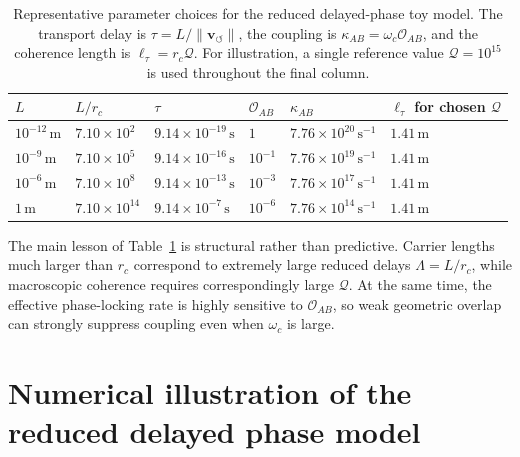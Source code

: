 \documentclass[11pt]{article}
\newcommand{\vnorm}{\lVert \mathbf{v}_{\!\boldsymbol{\circlearrowleft}}\rVert}
\newcommand{\rc}{r_c}
\begin{document}
        \begin{table}[h]
            \centering
            \caption{Representative parameter choices for the reduced delayed-phase toy model. The transport delay is \(\tau=L/\vnorm\), the coupling is \(\kappa_{AB}=\omega_c\mathcal{O}_{AB}\), and the coherence length is \(\ell_\tau=\rc\mathcal{Q}\). For illustration, a single reference value \(\mathcal{Q}=10^{15}\) is used throughout the final column.}
            \label{tab:toyparams}
            \begin{tabular}{llllll}
                \hline
                \(L\) & \(L/\rc\) & \(\tau\) & \(\mathcal{O}_{AB}\) & \(\kappa_{AB}\) & \(\ell_\tau\) for chosen \(\mathcal{Q}\) \\
                \hline
                \(10^{-12}\,\mathrm{m}\) & \(7.10\times 10^2\) & \(9.14\times 10^{-19}\,\mathrm{s}\) & \(1\) & \(7.76\times 10^{20}\,\mathrm{s^{-1}}\) & \(1.41\,\mathrm{m}\) \\
                \(10^{-9}\,\mathrm{m}\) & \(7.10\times 10^5\) & \(9.14\times 10^{-16}\,\mathrm{s}\) & \(10^{-1}\) & \(7.76\times 10^{19}\,\mathrm{s^{-1}}\) & \(1.41\,\mathrm{m}\) \\
                \(10^{-6}\,\mathrm{m}\) & \(7.10\times 10^8\) & \(9.14\times 10^{-13}\,\mathrm{s}\) & \(10^{-3}\) & \(7.76\times 10^{17}\,\mathrm{s^{-1}}\) & \(1.41\,\mathrm{m}\) \\
                \(1\,\mathrm{m}\) & \(7.10\times 10^{14}\) & \(9.14\times 10^{-7}\,\mathrm{s}\) & \(10^{-6}\) & \(7.76\times 10^{14}\,\mathrm{s^{-1}}\) & \(1.41\,\mathrm{m}\) \\
                \hline
            \end{tabular}
        \end{table}

        The main lesson of Table~\ref{tab:toyparams} is structural rather than predictive. Carrier lengths much larger than \(\rc\) correspond to extremely large reduced delays \(\Lambda=L/\rc\), while macroscopic coherence requires correspondingly large \(\mathcal{Q}\). At the same time, the effective phase-locking rate is highly sensitive to \(\mathcal{O}_{AB}\), so weak geometric overlap can strongly suppress coupling even when \(\omega_c\) is large.

    \section{Numerical illustration of the reduced delayed phase model}
\end{document}
